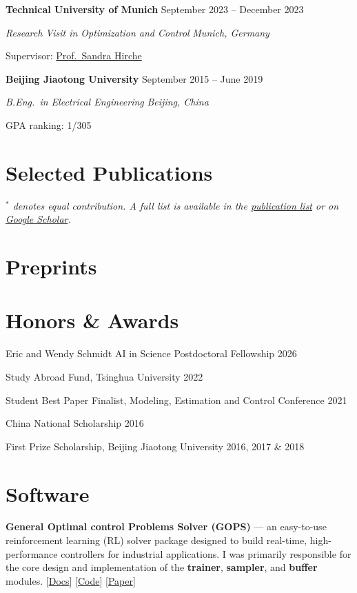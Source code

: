 \documentclass[11pt,a4paper]{article}
\newlength{\gapM}\setlength{\gapM}{4pt plus 2pt minus 1pt}  %
\newcommand{\entry}[4]{%
  \begin{samepage}%
  \textbf{#1} \hfill #2\par\nopagebreak
  {\itshape #3} \hfill {\itshape #4}\par\nopagebreak
  \end{samepage}}
\newcommand{\plink}[2]{[\href{#2}{#1}]}
\newcommand{\award}[2]{#1 \hfill #2\par\vspace{2pt plus 2pt}}
\begin{document}
\entry{Technical University of Munich}{September 2023 -- December 2023}
      {Research Visit in Optimization and Control}{Munich, Germany}
Supervisor: \href{https://www.ce.cit.tum.de/en/itr/hirche/}{Prof.\ Sandra Hirche}
\vspace{\gapM}

\entry{Beijing Jiaotong University}{September 2015 -- June 2019}
      {B.Eng.\ in Electrical Engineering}{Beijing, China}
GPA ranking: 1/305

\section{Selected Publications}
{\small\itshape $^*$ denotes equal contribution. A full list is available in the
\href{https://www.wenhancao.com/data/Publication_list_by_type.pdf}{publication list} or on
\href{https://scholar.google.com/citations?hl=en&user=43xAy7MAAAAJ}{Google Scholar}.}



\section{Preprints}


\section{Honors \& Awards}
\award{Eric and Wendy Schmidt AI in Science Postdoctoral Fellowship}{2026}
\award{Study Abroad Fund, Tsinghua University}{2022}
\award{Student Best Paper Finalist, Modeling, Estimation and Control Conference}{2021}
\award{China National Scholarship}{2016}
\award{First Prize Scholarship, Beijing Jiaotong University}{2016, 2017 \& 2018}

\section{Software}
\textbf{General Optimal control Problems Solver (GOPS)} --- an easy-to-use reinforcement learning (RL) solver package designed to build real-time, high-performance controllers for industrial applications. I was primarily responsible for the core design and implementation of the \textbf{trainer}, \textbf{sampler}, and \textbf{buffer} modules.
\plink{Docs}{https://gops.readthedocs.io/en/latest/index.html}
\plink{Code}{https://github.com/Intelligent-Driving-Laboratory/GOPS}
\plink{Paper}{https://www.sciencedirect.com/science/article/pii/S2772424723000070}
\end{document}
